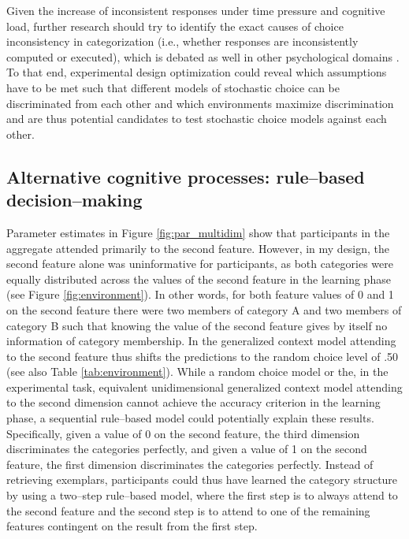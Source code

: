 \documentclass[a4paper,man,natbib]{apa6}
\begin{document}
Given the increase of inconsistent responses under time pressure and cognitive load, further research should try to identify the exact causes of choice inconsistency in categorization (i.e., whether responses are inconsistently computed or executed), which is debated as well in other psychological domains \citep{blavatskyy2010models}. To that end, experimental design optimization \citep{myung2004model} could reveal which assumptions have to be met such that different models of stochastic choice can be discriminated from each other and which environments maximize discrimination and are thus potential candidates to test stochastic choice models against each other.

\subsection{Alternative cognitive processes: rule--based decision--making}
Parameter estimates in Figure \ref{fig:par_multidim} show that participants in the aggregate attended primarily to the second feature. However, in my design, the second feature alone was uninformative for participants, as both categories were equally distributed across the values of the second feature in the learning phase (see Figure \ref{fig:environment}). In other words, for both feature values of 0 and 1 on the second feature there were two members of category A and two members of category B such that knowing the value of the second feature gives by itself no information of category membership. In the generalized context model attending to the second feature thus shifts the predictions to the random choice level of .50 (see also Table \ref{tab:environment}). While a random choice model or the, in the experimental task, equivalent unidimensional generalized context model attending to the second dimension cannot achieve the accuracy criterion in the learning phase, a sequential rule--based model could potentially explain these results. 
Specifically, given a value of 0 on the second feature, the third dimension discriminates the categories perfectly, and given a value of 1 on the second feature, the first dimension discriminates the categories perfectly. Instead of retrieving exemplars, participants could thus have learned the category structure by using a two--step rule--based model, where the first step is to always attend to the second feature and the second step is to attend to one of the remaining features contingent on the result from the first step.
\end{document}
